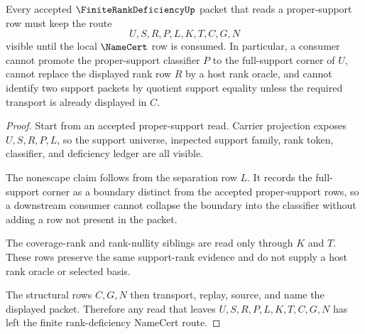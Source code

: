 \begin{theorem}
\label{thm:finite-rank-deficiency-proper-support-nonescape}
Every accepted $\FiniteRankDeficiencyUp$ packet that reads a proper-support row must keep the route
$$
U,S,R,P,L,K,T,C,G,N
$$
visible until the local $\NameCert$ row is consumed. In particular, a consumer cannot promote the proper-support classifier $P$ to the full-support corner of $U$, cannot replace the displayed rank row $R$ by a host rank oracle, and cannot identify two support packets by quotient support equality unless the required transport is already displayed in $C$.
\end{theorem}
\begin{proof}
Start from an accepted proper-support read. Carrier projection exposes $U,S,R,P,L$, so the support universe, inspected support family, rank token, classifier, and deficiency ledger are all visible.

The nonescape claim follows from the separation row $L$. It records the full-support corner as a boundary distinct from the accepted proper-support rows, so a downstream consumer cannot collapse the boundary into the classifier without adding a row not present in the packet.

The coverage-rank and rank-nullity siblings are read only through $K$ and $T$. These rows preserve the same support-rank evidence and do not supply a host rank oracle or selected basis.

The structural rows $C,G,N$ then transport, replay, source, and name the displayed packet. Therefore any read that leaves $U,S,R,P,L,K,T,C,G,N$ has left the finite rank-deficiency NameCert route.
\end{proof}




